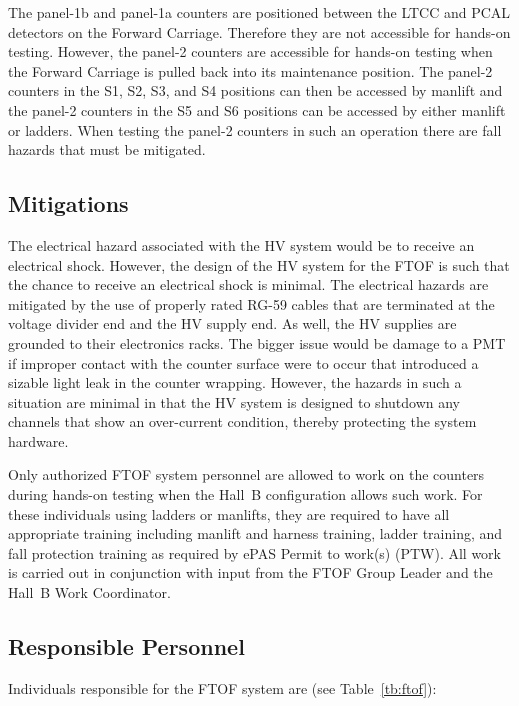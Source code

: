 The panel-1b and panel-1a counters are positioned between the LTCC and PCAL detectors on 
the Forward Carriage. Therefore they are not accessible for hands-on testing. However, 
the panel-2 counters are accessible for hands-on testing when the Forward Carriage is 
pulled back into its maintenance position. The panel-2 counters in the S1, S2, S3, and S4 
positions can then be accessed by manlift and the panel-2 counters in the S5 and S6 
positions can be accessed by either manlift or ladders. When testing the panel-2 counters 
in such an operation there are fall hazards that must be mitigated.

\subsection{Mitigations}

The electrical hazard associated with the HV system would be to receive an electrical 
shock. However, the design of the HV system for the FTOF is such that the chance to 
receive an electrical shock is minimal. The electrical hazards are mitigated by the use 
of properly rated RG-59 cables that are terminated at the voltage divider end and the HV 
supply end. As well, the HV supplies are grounded to their electronics racks. The bigger 
issue would be damage to a PMT if improper contact with the counter surface were to occur 
that introduced a sizable light leak in the counter wrapping. However, the hazards in such 
a situation are minimal in that the HV system is designed to shutdown any channels that 
show an over-current condition, thereby protecting the system hardware. 

Only authorized FTOF system personnel are allowed to work on the counters during hands-on
testing when the Hall~B configuration allows such work. For these individuals using ladders 
or manlifts, they are required to have all appropriate training including manlift and
harness training, ladder training, and fall protection training as required by ePAS Permit
to work(s) (PTW).  All work is carried out in conjunction with input from the FTOF Group
Leader and the Hall~B Work Coordinator.

\subsection{Responsible Personnel}

Individuals responsible for the FTOF system are (see Table~\ref{tb:ftof}):

